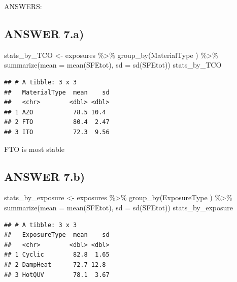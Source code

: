 \documentclass[
]{article}
\newenvironment{Shaded}{\begin{snugshade}}{\end{snugshade}}
\newcommand{\AttributeTok}[1]{\textcolor[rgb]{0.77,0.63,0.00}{#1}}
\newcommand{\FunctionTok}[1]{\textcolor[rgb]{0.00,0.00,0.00}{#1}}
\newcommand{\NormalTok}[1]{#1}
\newcommand{\OtherTok}[1]{\textcolor[rgb]{0.56,0.35,0.01}{#1}}
\newcommand{\SpecialCharTok}[1]{\textcolor[rgb]{0.00,0.00,0.00}{#1}}
\begin{document}
ANSWERS:

\hypertarget{answer-7.a}{%
\subsection{ANSWER 7.a)}\label{answer-7.a}}

\begin{Shaded}
\begin{Highlighting}[]
\NormalTok{stats\_by\_TCO }\OtherTok{\textless{}{-}}\NormalTok{ exposures }\SpecialCharTok{\%\textgreater{}\%} \FunctionTok{group\_by}\NormalTok{(MaterialType}
\NormalTok{                      ) }\SpecialCharTok{\%\textgreater{}\%} \FunctionTok{summarize}\NormalTok{(}\AttributeTok{mean =} \FunctionTok{mean}\NormalTok{(SFEtot), }
                                      \AttributeTok{sd =} \FunctionTok{sd}\NormalTok{(SFEtot))}
\NormalTok{stats\_by\_TCO}
\end{Highlighting}
\end{Shaded}

\begin{verbatim}
## # A tibble: 3 x 3
##   MaterialType  mean    sd
##   <chr>        <dbl> <dbl>
## 1 AZO           78.5 10.4 
## 2 FTO           80.4  2.47
## 3 ITO           72.3  9.56
\end{verbatim}

FTO is most stable

\hypertarget{answer-7.b}{%
\subsection{ANSWER 7.b)}\label{answer-7.b}}

\begin{Shaded}
\begin{Highlighting}[]
\NormalTok{stats\_by\_exposure }\OtherTok{\textless{}{-}}\NormalTok{ exposures }\SpecialCharTok{\%\textgreater{}\%} \FunctionTok{group\_by}\NormalTok{(ExposureType}
\NormalTok{                      ) }\SpecialCharTok{\%\textgreater{}\%} \FunctionTok{summarize}\NormalTok{(}\AttributeTok{mean =} \FunctionTok{mean}\NormalTok{(SFEtot),}
                                      \AttributeTok{sd =} \FunctionTok{sd}\NormalTok{(SFEtot))}
\NormalTok{stats\_by\_exposure}
\end{Highlighting}
\end{Shaded}

\begin{verbatim}
## # A tibble: 3 x 3
##   ExposureType  mean    sd
##   <chr>        <dbl> <dbl>
## 1 Cyclic        82.8  1.65
## 2 DampHeat      72.7 12.8 
## 3 HotQUV        78.1  3.67
\end{verbatim}
\end{document}
